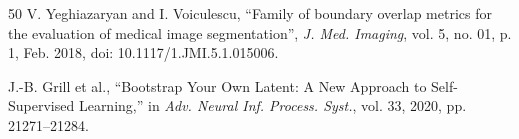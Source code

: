 \documentclass[12pt,a4paper]{article}
\begin{document}
\begin{thebibliography}{50}
V. Yeghiazaryan and I. Voiculescu, ``Family of boundary overlap metrics for the evaluation of medical image segmentation'', \textit{J. Med. Imaging}, vol. 5, no. 01, p. 1, Feb. 2018, doi: 10.1117/1.JMI.5.1.015006.

J.-B. Grill et al., ``Bootstrap Your Own Latent: A New Approach to Self-Supervised Learning,'' in \textit{Adv. Neural Inf. Process. Syst.}, vol. 33, 2020, pp. 21271–21284.


\end{thebibliography}
\end{document}
